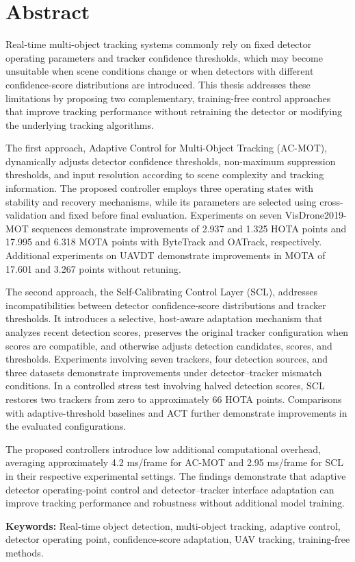\chapter*{Abstract}

Real-time multi-object tracking systems commonly rely on fixed detector operating parameters and tracker confidence thresholds, which may become unsuitable when scene conditions change or when detectors with different confidence-score distributions are introduced. This thesis addresses these limitations by proposing two complementary, training-free control approaches that improve tracking performance without retraining the detector or modifying the underlying tracking algorithms.

The first approach, Adaptive Control for Multi-Object Tracking (AC-MOT), dynamically adjusts detector confidence thresholds, non-maximum suppression thresholds, and input resolution according to scene complexity and tracking information. The proposed controller employs three operating states with stability and recovery mechanisms, while its parameters are selected using cross-validation and fixed before final evaluation. Experiments on seven VisDrone2019-MOT sequences demonstrate improvements of 2.937 and 1.325 HOTA points and 17.995 and 6.318 MOTA points with ByteTrack and OATrack, respectively. Additional experiments on UAVDT demonstrate improvements in MOTA of 17.601 and 3.267 points without retuning.

The second approach, the Self-Calibrating Control Layer (SCL), addresses incompatibilities between detector confidence-score distributions and tracker thresholds. It introduces a selective, host-aware adaptation mechanism that analyzes recent detection scores, preserves the original tracker configuration when scores are compatible, and otherwise adjusts detection candidates, scores, and thresholds. Experiments involving seven trackers, four detection sources, and three datasets demonstrate improvements under detector--tracker mismatch conditions. In a controlled stress test involving halved detection scores, SCL restores two trackers from zero to approximately 66 HOTA points. Comparisons with adaptive-threshold baselines and ACT further demonstrate improvements in the evaluated configurations.

The proposed controllers introduce low additional computational overhead, averaging approximately 4.2 ms/frame for AC-MOT and 2.95 ms/frame for SCL in their respective experimental settings. The findings demonstrate that adaptive detector operating-point control and detector--tracker interface adaptation can improve tracking performance and robustness without additional model training.

\vspace{0.5cm}
\noindent\textbf{Keywords:} Real-time object detection, multi-object tracking, adaptive control, detector operating point, confidence-score adaptation, UAV tracking, training-free methods.
